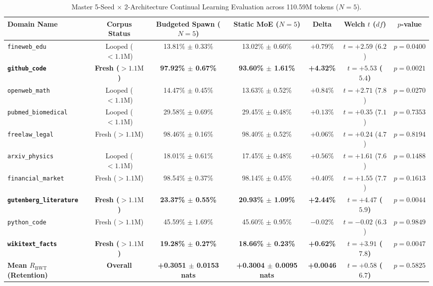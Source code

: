 \documentclass[10pt,twocolumn,letterpaper]{article}
\begin{document}
\begin{table}[t]
\centering
\small
\begin{tabular}{@{}lcccccc@{}}
\toprule
\textbf{Domain Name} & \textbf{Corpus Status} & \textbf{Budgeted Spawn ($N=5$)} & \textbf{Static MoE ($N=5$)} & \textbf{Delta} & \textbf{Welch $t$ ($df$)} & \textbf{$p$-value} \\ \midrule
\texttt{fineweb\_edu} & Looped ($<1.1\text{M}$) & 13.81\% $\pm$ 0.33\% & 13.02\% $\pm$ 0.60\% & $+0.79\%$ & $t = +2.59$ ($6.2$) & $p = 0.0400$ \\
\textbf{\texttt{github\_code}} & \textbf{Fresh ($>1.1\text{M}$)} & \textbf{97.92\% $\pm$ 0.67\%} & \textbf{93.60\% $\pm$ 1.61\%} & \textbf{+4.32\%} & \textbf{$t = +5.53$ ($5.4$)} & \textbf{$p = 0.0021$} \\
\texttt{openweb\_math} & Looped ($<1.1\text{M}$) & 14.47\% $\pm$ 0.45\% & 13.63\% $\pm$ 0.52\% & $+0.84\%$ & $t = +2.71$ ($7.8$) & $p = 0.0270$ \\
\texttt{pubmed\_biomedical} & Looped ($<1.1\text{M}$) & 29.58\% $\pm$ 0.69\% & 29.45\% $\pm$ 0.48\% & $+0.13\%$ & $t = +0.35$ ($7.1$) & $p = 0.7353$ \\
\texttt{freelaw\_legal} & Fresh ($>1.1\text{M}$) & 98.46\% $\pm$ 0.16\% & 98.40\% $\pm$ 0.52\% & $+0.06\%$ & $t = +0.24$ ($4.7$) & $p = 0.8194$ \\
\texttt{arxiv\_physics} & Looped ($<1.1\text{M}$) & 18.01\% $\pm$ 0.61\% & 17.45\% $\pm$ 0.48\% & $+0.56\%$ & $t = +1.61$ ($7.6$) & $p = 0.1488$ \\
\texttt{financial\_market} & Fresh ($>1.1\text{M}$) & 98.54\% $\pm$ 0.37\% & 98.14\% $\pm$ 0.45\% & $+0.40\%$ & $t = +1.55$ ($7.7$) & $p = 0.1613$ \\
\textbf{\texttt{gutenberg\_literature}} & \textbf{Fresh ($>1.1\text{M}$)} & \textbf{23.37\% $\pm$ 0.55\%} & \textbf{20.93\% $\pm$ 1.09\%} & \textbf{+2.44\%} & \textbf{$t = +4.47$ ($5.9$)} & \textbf{$p = 0.0044$} \\
\texttt{python\_code} & Fresh ($>1.1\text{M}$) & 45.59\% $\pm$ 1.69\% & 45.60\% $\pm$ 0.95\% & $-0.02\%$ & $t = -0.02$ ($6.3$) & $p = 0.9849$ \\
\textbf{\texttt{wikitext\_facts}} & \textbf{Fresh ($>1.1\text{M}$)} & \textbf{19.28\% $\pm$ 0.27\%} & \textbf{18.66\% $\pm$ 0.23\%} & \textbf{+0.62\%} & \textbf{$t = +3.91$ ($7.8$)} & \textbf{$p = 0.0047$} \\ \midrule
\textbf{Mean $R_{\text{BWT}}$ (Retention)} & \textbf{Overall} & \textbf{+0.3051 $\pm$ 0.0153 nats} & \textbf{+0.3004 $\pm$ 0.0095 nats} & \textbf{+0.0046} & \textbf{$t = +0.58$ ($6.7$)} & \textbf{$p = 0.5825$} \\
\bottomrule
\end{tabular}
\caption{Master 5-Seed $\times$ 2-Architecture Continual Learning Evaluation across 110.59M tokens ($N=5$).}
\label{tab:results}
\end{table}
\end{document}
